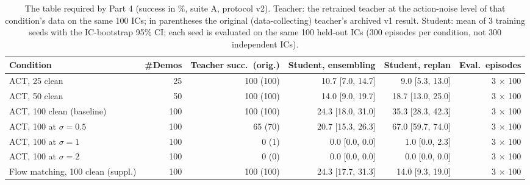 \begin{table}[t]
\centering
\scriptsize
\begin{adjustbox}{max width=\linewidth}
\begin{tabular}{lrrrrr}
\toprule
Condition & \#Demos & Teacher succ.\ (orig.) & Student, ensembling & Student, replan & Eval.\ episodes \\
\midrule
ACT, 25 clean & 25 & 100 (100) & 10.7 [7.0, 14.7] & 9.0 [5.3, 13.0] & 3 $\times$ 100 \\
ACT, 50 clean & 50 & 100 (100) & 14.0 [9.0, 19.7] & 18.7 [13.0, 25.0] & 3 $\times$ 100 \\
ACT, 100 clean (baseline) & 100 & 100 (100) & 24.3 [18.0, 31.0] & 35.3 [28.3, 42.3] & 3 $\times$ 100 \\
\midrule
ACT, 100 at $\sigma{=}0.5$ & 100 & 65 (70) & 20.7 [15.3, 26.3] & 67.0 [59.7, 74.0] & 3 $\times$ 100 \\
ACT, 100 at $\sigma{=}1$ & 100 & 0 (1) & 0.0 [0.0, 0.0] & 1.0 [0.0, 2.3] & 3 $\times$ 100 \\
ACT, 100 at $\sigma{=}2$ & 100 & 0 (0) & 0.0 [0.0, 0.0] & 0.0 [0.0, 0.0] & 3 $\times$ 100 \\
\midrule
Flow matching, 100 clean (suppl.) & 100 & 100 (100) & 24.3 [17.7, 31.3] & 14.0 [9.3, 19.0] & 3 $\times$ 100 \\
\bottomrule
\end{tabular}
\end{adjustbox}
\caption{The table required by Part 4 (success in \%, suite A, protocol v2). Teacher: the retrained teacher at the action-noise level of that condition's data on the same 100 ICs; in parentheses the original (data-collecting) teacher's archived v1 result. Student: mean of 3 training seeds with the IC-bootstrap 95\% CI; each seed is evaluated on the same 100 held-out ICs (300 episodes per condition, not 300 independent ICs).}
\label{tab:required}
\end{table}
